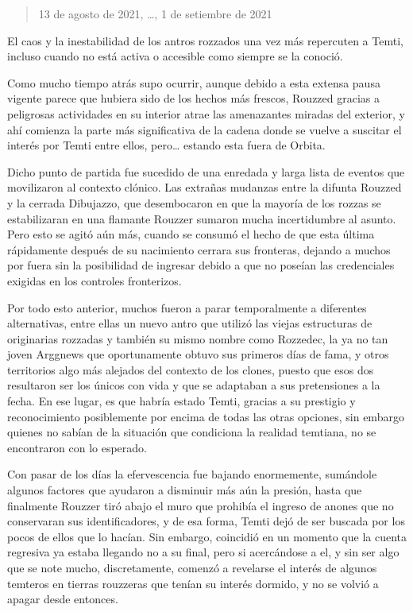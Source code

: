 \documentclass[
]{book}
\begin{document}
\begin{quote}
13 de agosto de 2021, \ldots, 1 de setiembre de 2021
\end{quote}

El caos y la inestabilidad de los antros rozzados una vez más repercuten a Temti, incluso cuando no está activa o accesible como siempre se la conoció.

Como mucho tiempo atrás supo ocurrir, aunque debido a esta extensa pausa vigente parece que hubiera sido de los hechos más frescos, Rouzzed gracias a peligrosas actividades en su interior atrae las amenazantes miradas del exterior, y ahí comienza la parte más significativa de la cadena donde se vuelve a suscitar el interés por Temti entre ellos, pero\ldots{} estando esta fuera de Orbita.

Dicho punto de partida fue sucedido de una enredada y larga lista de eventos que movilizaron al contexto clónico. Las extrañas mudanzas entre la difunta Rouzzed y la cerrada Dibujazzo, que desembocaron en que la mayoría de los rozzas se estabilizaran en una flamante Rouzzer sumaron mucha incertidumbre al asunto. Pero esto se agitó aún más, cuando se consumó el hecho de que esta última rápidamente después de su nacimiento cerrara sus fronteras, dejando a muchos por fuera sin la posibilidad de ingresar debido a que no poseían las credenciales exigidas en los controles fronterizos.

Por todo esto anterior, muchos fueron a parar temporalmente a diferentes alternativas, entre ellas un nuevo antro que utilizó las viejas estructuras de originarias rozzadas y también su mismo nombre como Rozzedec, la ya no tan joven Arggnews que oportunamente obtuvo sus primeros días de fama, y otros territorios algo más alejados del contexto de los clones, puesto que esos dos resultaron ser los únicos con vida y que se adaptaban a sus pretensiones a la fecha. En ese lugar, es que habría estado Temti, gracias a su prestigio y reconocimiento posiblemente por encima de todas las otras opciones, sin embargo quienes no sabían de la situación que condiciona la realidad temtiana, no se encontraron con lo esperado.

Con pasar de los días la efervescencia fue bajando enormemente, sumándole algunos factores que ayudaron a disminuir más aún la presión, hasta que finalmente Rouzzer tiró abajo el muro que prohibía el ingreso de anones que no conservaran sus identificadores, y de esa forma, Temti dejó de ser buscada por los pocos de ellos que lo hacían. Sin embargo, coincidió en un momento que la cuenta regresiva ya estaba llegando no a su final, pero si acercándose a el, y sin ser algo que se note mucho, discretamente, comenzó a revelarse el interés de algunos temteros en tierras rouzzeras que tenían su interés dormido, y no se volvió a apagar desde entonces.
\end{document}
